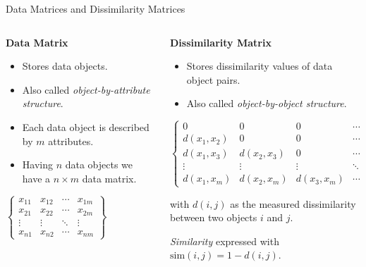 \begin{frame}{Data Matrices and Dissimilarity Matrices}
	\begin{columns}
		\begin{column}{0.5\textwidth}
			\textbf{Data Matrix}

			\begin{itemize}
				\item Stores data objects.
				\item Also called \textit{object-by-attribute structure}.
				\item Each data object is described by $m$ attributes.
				\item Having $n$ data objects we have a $n\times m$ data matrix.
			\end{itemize}
			\vspace*{1em}
			\begin{center}
				{$\begin{Bmatrix}
							x_{11} & x_{12} & \cdots & x_{1m} \\
							x_{21} & x_{22} & \cdots & x_{2m} \\
							\vdots & \vdots & \ddots & \vdots \\
							x_{n1} & x_{n2} & \cdots & x_{nm}
						\end{Bmatrix}$ }
			\end{center}
		\end{column}

		\begin{column}{0.5\textwidth}
			\textbf{Dissimilarity Matrix}

			\begin{itemize}
				\item Stores dissimilarity values of data object pairs.
				\item Also called \textit{object-by-object structure}.
			\end{itemize}
			\begin{center}
				{$\begin{Bmatrix}
							0              & 0              & 0              & \cdots & 0      \\
							d(x_{1},x_{2}) & 0              & 0              & \cdots & 0      \\
							d(x_{1},x_{3}) & d(x_{2},x_{3}) & 0              & \cdots & 0      \\
							\vdots         & \vdots         & \vdots         & \ddots & \vdots \\
							d(x_{1},x_{m}) & d(x_{2},x_{m}) & d(x_{3},x_{m}) & \cdots & 0
						\end{Bmatrix}$}
			\end{center}
			with $d(i, j)$ as the measured dissimilarity between two objects $i$ and $j$.

			\textit{Similarity} expressed with $\text{sim}(i,j) = 1 - d(i, j)$.
		\end{column}
	\end{columns}
\end{frame}

